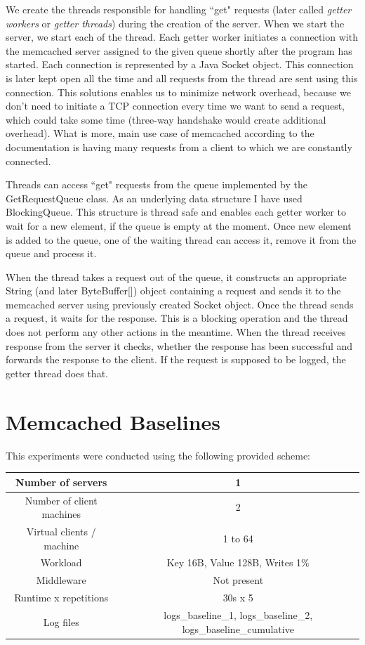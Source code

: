 \documentclass[11pt]{article}
\begin{document}
We create the threads responsible for handling ``get" requests (later called {\it getter workers} or {\it getter threads}) during the creation of the server. When we start the server, we start each of the thread. Each getter worker initiates a connection with the memcached server assigned to the given queue shortly after the program has started. Each connection is represented by a Java Socket object. This connection is later kept open all the time and all requests from the thread are sent using this connection. This solutions enables us to minimize network overhead, because we don't need to initiate a TCP connection every time we want to send a request, which could take some time (three-way handshake would create additional overhead). What is more, main use case of memcached according to the documentation is having many requests from a client to which we are constantly connected.

Threads can access ``get" requests from the queue implemented by the GetRequestQueue class. As an underlying data structure I have used BlockingQueue. This structure is thread safe and enables each getter worker to wait for a new element, if the queue is empty at the moment. Once new element is added to the queue, one of the waiting thread can access it, remove it from the queue and process it.

When the thread takes a request out of the queue, it constructs an appropriate String (and later ByteBuffer[]) object containing a request and sends it to the memcached server using previously created Socket object. Once the thread sends a request, it waits for the response. This is a blocking operation and the thread does not perform any other actions in the meantime. When the thread receives response from the server it checks, whether the response has been successful and forwards the response to the client. If the request is supposed to be logged, the getter thread does that.

\section{Memcached Baselines}\label{sec:baseline}

This experiments were conducted using the following provided scheme:
\medskip

\small{
\smallskip
\begin{tabular}{|c|c|}
\hline Number of servers & 1 \\ 
\hline Number of client machines & 2 \\ 
\hline Virtual clients / machine & 1 to 64 \\ 
\hline Workload & Key 16B, Value 128B, Writes 1\% \\
\hline Middleware & Not present \\ 
\hline Runtime x repetitions & 30s x 5 \\ 
\hline Log files & logs\_baseline\_1, logs\_baseline\_2, logs\_baseline\_cumulative \\
\hline 
\end{tabular} }
\medskip
\end{document}
